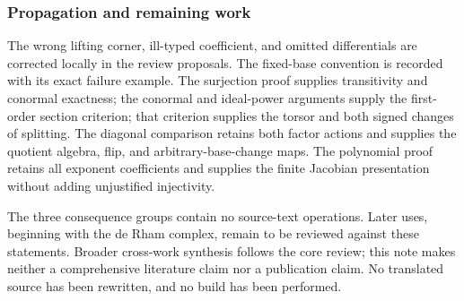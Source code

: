 \subsubsection{Propagation and remaining work}\label{algebra-proof-041-propagation-and-remaining-work}

The wrong lifting corner, ill-typed coefficient, and omitted differentials are corrected locally in the review proposals. The fixed-base convention is recorded with its exact failure example. The surjection proof supplies transitivity and conormal exactness; the conormal and ideal-power arguments supply the first-order section criterion; that criterion supplies the torsor and both signed changes of splitting. The diagonal comparison retains both factor actions and supplies the quotient algebra, flip, and arbitrary-base-change maps. The polynomial proof retains all exponent coefficients and supplies the finite Jacobian presentation without adding unjustified injectivity.

The three consequence groups contain no source-text operations. Later uses, beginning with the de Rham complex, remain to be reviewed against these statements. Broader cross-work synthesis follows the core review; this note makes neither a comprehensive literature claim nor a publication claim. No translated source has been rewritten, and no build has been performed.

